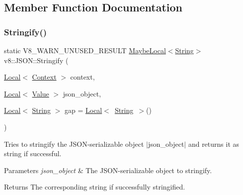 \subsection{Member Function Documentation}
\mbox{\label{classv8_1_1JSON_ac5ddb9edc1369a7d889b7ac8411e7b71}} 
\subsubsection{\texorpdfstring{Stringify()}{Stringify()}}
{\footnotesize\ttfamily static V8\+\_\+\+W\+A\+R\+N\+\_\+\+U\+N\+U\+S\+E\+D\+\_\+\+R\+E\+S\+U\+LT \mbox{\hyperlink{classv8_1_1MaybeLocal}{Maybe\+Local}}$<$\mbox{\hyperlink{classv8_1_1String}{String}}$>$ v8\+::\+J\+S\+O\+N\+::\+Stringify (\begin{DoxyParamCaption}\item[{\mbox{\hyperlink{classv8_1_1Local}{Local}}$<$ \mbox{\hyperlink{classv8_1_1Context}{Context}} $>$}]{context,  }\item[{\mbox{\hyperlink{classv8_1_1Local}{Local}}$<$ \mbox{\hyperlink{classv8_1_1Value}{Value}} $>$}]{json\+\_\+object,  }\item[{\mbox{\hyperlink{classv8_1_1Local}{Local}}$<$ \mbox{\hyperlink{classv8_1_1String}{String}} $>$}]{gap = {\ttfamily \mbox{\hyperlink{classv8_1_1Local}{Local}}$<$~\mbox{\hyperlink{classv8_1_1String}{String}}~$>$()} }\end{DoxyParamCaption})\hspace{0.3cm}{\ttfamily [static]}}

Tries to stringify the J\+S\+O\+N-\/serializable object $\vert$json\+\_\+object$\vert$ and returns it as string if successful.


\begin{DoxyParams}{Parameters}
{\em json\+\_\+object} & The J\+S\+O\+N-\/serializable object to stringify. \\
\hline
\end{DoxyParams}
\begin{DoxyReturn}{Returns}
The corresponding string if successfully stringified. 
\end{DoxyReturn}
\mbox{\label{classv8_1_1JSON_ae87740238959f9a8536d8e70daf37104}} 
